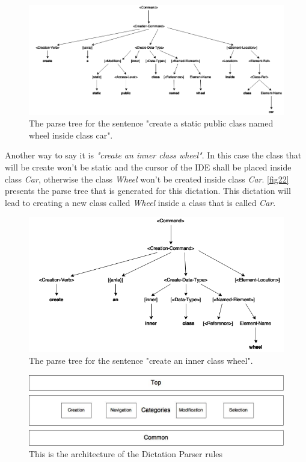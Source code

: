 \begin{figure}[H]
\centering
\includegraphics[scale=0.4]{"./fig/Parse Tree create a static public class named wheel inside class car"}
\caption{The parse tree for the sentence "create a static public class named wheel inside class car".}
\label{fig21}
\end{figure}

Another way to say it is \textit{"create an inner class wheel"}. In this case the class that will be create won't be static and the cursor of the IDE shall be placed inside class \textit{Car}, otherwise the class \textit{Wheel} won't be created inside class \textit{Car}. \autoref{fig22} presents the parse tree that is generated for this dictation. This dictation will lead to creating a new class called \textit{Wheel} inside a class that is called \textit{Car}.

\begin{figure}[H]
\centering
\includegraphics[scale=0.4]{"./fig/Parse Tree create an inner class wheel"}
\caption{The parse tree for the sentence "create an inner class wheel".}
\label{fig22}
\end{figure}

\begin{figure}[H]
\centering
\includegraphics[scale=0.4]{./fig/BNFDiagram}
\caption{This is the architecture of the Dictation Parser rules}
\label{fig23}
\end{figure}

